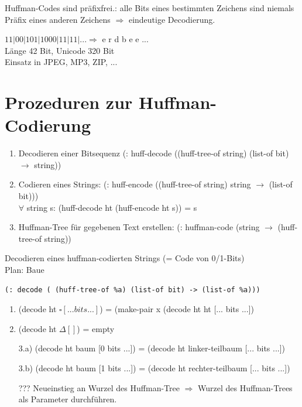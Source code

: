 \documentclass[a4paper, 20pt, openany]{book}
\begin{document}
Huffman-Codes sind präfixfrei.: alle Bits eines bestimmten Zeichens sind niemals Präfix eines anderen Zeichens $\Rightarrow$ eindeutige Decodierung.

$11 | 00 | 101 | 1000 | 11 | 11 | ...  \Rightarrow$ e r d b e e ...\\
Länge 42 Bit, Unicode 320 Bit\\
Einsatz in JPEG, MP3, ZIP, ...\\

\section{Prozeduren zur Huffman-Codierung}
\begin{enumerate}
\item Decodieren einer Bitsequenz (: huff-decode ((huff-tree-of string) (list-of bit) $\rightarrow$ string))
\item Codieren eines Strings: (: huff-encode ((huff-tree-of string) string $\rightarrow$ (list-of bit)))\\
$\forall$ string s: (huff-decode ht (huff-encode ht s)) = s
\item Huffman-Tree für gegebenen Text erstellen: (: huffman-code (string $\rightarrow$ (huff-tree-of string))
\end{enumerate}

Decodieren eines huffman-codierten Strings (= Code von 0/1-Bits)\\
Plan: Baue
\begin{lstlisting}
(: decode ( (huff-tree-of %a) (list-of bit) -> (list-of %a)))
\end{lstlisting}
\begin{enumerate}
\item (decode ht $\square [... bits ...]$) = (make-pair x (decode ht ht [... bits ...])
\item (decode ht $\Delta [ ]$) = empty
\item[3.a)] (decode ht baum [0 bits ...]) = (decode ht linker-teilbaum [... bits ...])
\item[3.b)] (decode ht baum [1 bits ...]) = (decode ht rechter-teilbaum [... bits ...])

??? Neueinstieg an Wurzel des Huffman-Tree $\Rightarrow$ Wurzel des Huffman-Trees als Parameter durchführen.
\end{enumerate}
\end{document}
